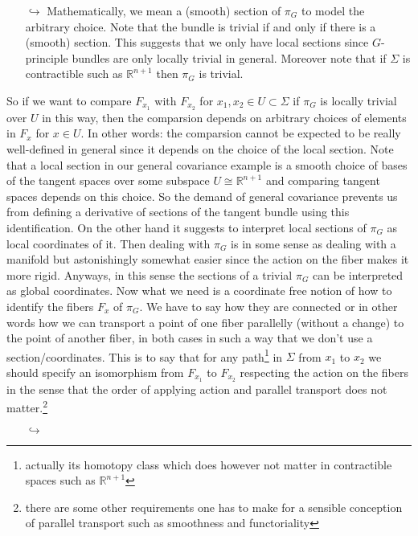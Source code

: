 \begin{enumerate}
\begin{enumerate}
\item[$\pmb{\hookrightarrow}$]
Mathematically, we mean a (smooth) section of $\pi_{G}$ to model the arbitrary choice. Note that the bundle is trivial if and only if there is a (smooth) section. This suggests that we only have local sections since $G$-principle bundles are only locally trivial in general. Moreover note that if $\Sigma$ is contractible such as $\mathbb{R}^{n+1}$ then $\pi_{G}$ is trivial.
\end{enumerate}
So if we want to compare $F_{x_{1}}$ with $F_{x_{2}}$ for $x_{1},x_{2} \in U \subset \Sigma$ if $\pi_{G}$ is locally trivial over $U$ in this way, then the comparsion depends on arbitrary choices of elements in $F_{x}$ for $x \in U$. In other words: the comparsion cannot be expected to be really well-defined in general since it depends on the choice of the local section. Note that a local section in our general covariance example is a smooth choice of bases of the tangent spaces over some subspace $U \cong \mathbb{R}^{n+1}$ and comparing tangent spaces depends on this choice. So the demand of general covariance prevents us from defining a derivative of sections of the tangent bundle using this identification. On the other hand it suggests to interpret local sections of $\pi_{G}$ as local coordinates of it. Then dealing with $\pi_{G}$ is in some sense as dealing with a manifold but astonishingly somewhat easier since the action on the fiber makes it more rigid. Anyways, in this sense the sections of a trivial $\pi_{G}$ can be interpreted as global coordinates. Now what we need is a coordinate free notion of how to identify the fibers $F_{x}$ of $\pi_{G}$. We have to say how they are connected or in other words how we can transport a point of one fiber parallelly (without a change) to the point of another fiber, in both cases in such a way that we don't use a section/coordinates. This is to say that for any path\footnote{actually its homotopy class which does however not matter in contractible spaces such as $\mathbb{R}^{n+1}$} in $\Sigma$ from $x_{1}$ to $x_{2}$ we should specify an isomorphism from $F_{x_{1}}$ to $F_{x_{2}}$ respecting the action on the fibers in the sense that the order of applying action and parallel transport does not matter.\footnote{there are some other requirements one has to make for a sensible conception of parallel transport such as smoothness and functoriality}
\begin{enumerate}
\item[$\pmb{\hookrightarrow}$]

\end{enumerate}
\end{enumerate}
